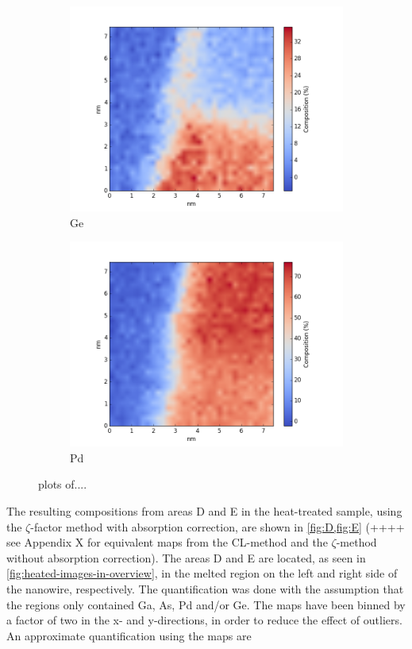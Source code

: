 \begin{figure}
\begin{subfigure}{0.5\textwidth}
		\includegraphics[width=\textwidth]{fig/q/E_heatedGeKline/Ge_zetaAbs}
		\caption{Ge}
		\label{fig:Ege}
	\end{subfigure}%
	\hfill
	\begin{subfigure}{0.5\textwidth}
		\includegraphics[width=\textwidth]{fig/q/E_heatedGeKline/Pd_zetaAbs}
		\caption{Pd}
		\label{fig:Epd}
	\end{subfigure}
	\caption{plots of....}
	\label{fig:E}
\end{figure}

The resulting compositions from areas D and E in the heat-treated sample, using the $\zeta$-factor method with absorption correction, are shown in \cref{fig:D,fig:E} (++++ see Appendix X for equivalent maps from the CL-method and the $\zeta$-method without absorption correction). The areas D and E are located, as seen in \cref{fig:heated-images-in-overview}, in the melted region on the left and right side of the nanowire, respectively. The quantification was done with the assumption that the regions only contained Ga, As, Pd and/or Ge. The maps have been binned by a factor of two in the x- and y-directions, in order to reduce the effect of outliers. An approximate quantification using the maps are 

